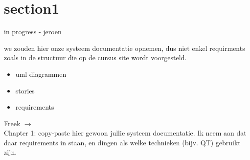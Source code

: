 \section{section1}

\begin{tcolorbox}[colback=green!30]
  in progress - jeroen
\end{tcolorbox}


\begin{tcolorbox}[colback=yellow!30]
  we zouden hier onze systeem documentatie opnemen, dus niet enkel requirments
  zoals in de structuur die op de cursus site wordt voorgesteld.
  \begin{itemize}
  	\item uml diagrammen
  	\item stories
  	\item requirements
  \end{itemize}
  
  Freek $\rightarrow$ \\
  Chapter 1: copy-paste hier gewoon jullie systeem documentatie. Ik neem aan dat daar requirements in staan, en dingen als welke technieken (bijv. QT) gebruikt zijn.
  
\end{tcolorbox}


